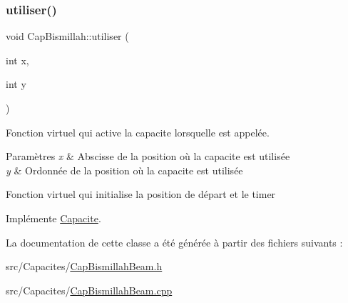 \mbox{\label{class_cap_bismillah_a9c3b48cacee26d055f24bf05f669cfca}} 
\subsubsection{\texorpdfstring{utiliser()}{utiliser()}}
{\footnotesize\ttfamily void Cap\+Bismillah\+::utiliser (\begin{DoxyParamCaption}\item[{int}]{x,  }\item[{int}]{y }\end{DoxyParamCaption})\hspace{0.3cm}{\ttfamily [virtual]}}



Fonction virtuel qui active la capacite lorsqu\textquotesingle{}elle est appelée. 


\begin{DoxyParams}{Paramètres}
{\em x} & Abscisse de la position où la capacite est utilisée \\
\hline
{\em y} & Ordonnée de la position où la capacite est utilisée\\
\hline
\end{DoxyParams}
Fonction virtuel qui initialise la position de départ et le timer 

Implémente \hyperlink{class_capacite_a6f5e6efda11f80ab8538e23f5bdc6e79}{Capacite}.



La documentation de cette classe a été générée à partir des fichiers suivants \+:\begin{DoxyCompactItemize}
\item 
src/\+Capacites/\hyperlink{_cap_bismillah_beam_8h}{Cap\+Bismillah\+Beam.\+h}\item 
src/\+Capacites/\hyperlink{_cap_bismillah_beam_8cpp}{Cap\+Bismillah\+Beam.\+cpp}\end{DoxyCompactItemize}
